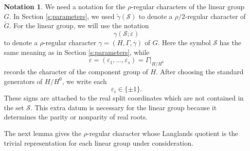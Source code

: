 \documentclass{amsart}
\theoremstyle{definition}
\newtheorem{notation}[thm]{Notation}
\newcommand{\tu}{\widetilde}
\begin{document}
\begin{notation} \label{n:linear-param}
We need a notation for the $\rho$-regular characters of the linear group $G$.
In Section \ref{s:parameters}, we used $\tu\gamma(\mathcal S)$ to denote a
$\rho/2$-regular character of $\tu G$. For the linear group, we will use the
notation
\begin{equation}\label{e:linear-param}
\gamma(\mathcal S;\varepsilon)
\end{equation}
to denote a $\rho$-regular character
$\gamma=(H,\Gamma,\overline\gamma)$
of $G$. Here the symbol $\mathcal S$ has the same meaning as in Section
\ref{s:parameters}, while
\[
\varepsilon=(\varepsilon_1,\ldots,\varepsilon_s)
=
\Gamma|_{H/H^0}
\]
records the character of the component group of $H$. After choosing the
standard generators of $H/H^0$, we write each
\[
\varepsilon_i\in\{\pm1\}.
\]
These signs are attached to the real split coordinates which are not contained
in the set $\mathcal S$. This extra datum is necessary for the linear group
because it determines the parity or nonparity of real roots.
\end{notation}

The next lemma gives the $\rho$-regular character whose Langlands quotient is
the trivial representation for each linear group under consideration.
\end{document}
